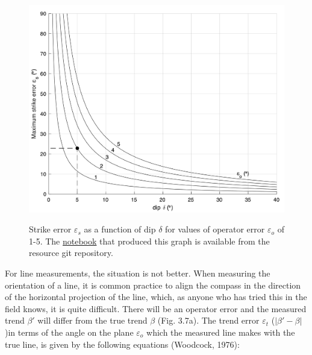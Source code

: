 \documentclass[a4paper , 12pt]{book}
\begin{document}
\begin{figure}[ht]
    \centering
    {\includegraphics[width=13cm]{Figures/ch3f6.png}}
    \caption{Strike error $\varepsilon_s$ as a function of dip $\delta$ for values of operator error $\varepsilon_o$  of 1-5\degree. The \href{https://github.com/nfcd/compGeo/blob/master/source/notebooks/ch3fig6.ipynb}{notebook} that produced this graph is available from the resource git repository.}
\end{figure}

For line measurements, the situation is not better. When measuring the orientation of a line, it is common practice to align the compass in the direction of the horizontal projection of the line, which, as anyone who has tried this in the field knows, it is quite difficult. There will be an operator error and the measured trend $\beta\text{$'$}$ will differ from the true trend $\beta$ (Fig. 3.7a). The trend error $\varepsilon_t$ ($|\beta\text{$'$}- \beta|$)in terms of the angle on the plane $\varepsilon_o$ which the measured line makes with the true line, is given by the following equations (Woodcock, 1976): 
\end{document}
